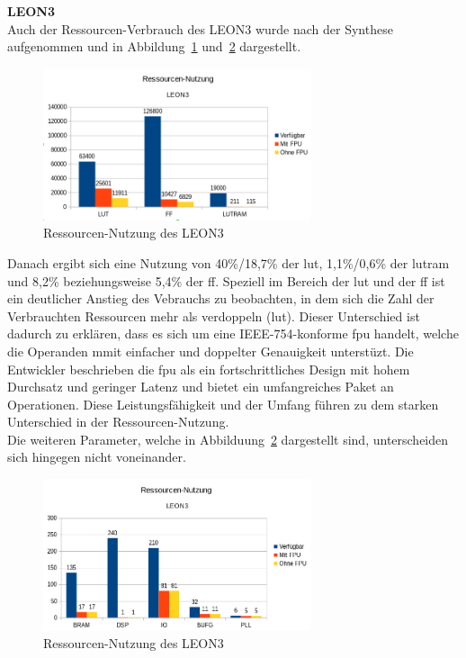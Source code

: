 \textbf{LEON3}\\

Auch der Ressourcen-Verbrauch des LEON3 wurde nach der Synthese aufgenommen und in Abbildung~\ref{fig:ressourcenleon31} und~\ref{fig:ressourcenleon32} dargestellt.\\

\begin{figure}[H]
\centering
\includegraphics[width=0.7\textwidth]{Hauptteil/ressourcennutzungleon31.png}
\caption{Ressourcen-Nutzung des LEON3}
\label{fig:ressourcenleon31}
\end{figure}

Danach ergibt sich eine Nutzung von 40\%/18,7\% der \ac{lut}, 1,1\%/0,6\% der \ac{lutram} und 8,2\% beziehungsweise 5,4\% der \ac{ff}.
Speziell im Bereich der \ac{lut} und der \ac{ff} ist ein deutlicher Anstieg des Vebrauchs zu beobachten, in dem sich die Zahl der Verbrauchten Ressourcen mehr als verdoppeln (\ac{lut}).
Dieser Unterschied ist dadurch zu erklären, dass es sich um eine IEEE-754-konforme \ac{fpu} handelt, welche die Operanden mmit einfacher und doppelter Genauigkeit unterstüzt. Die Entwickler
beschrieben die \ac{fpu} als ein fortschrittliches Design mit hohem Durchsatz und geringer Latenz und bietet ein umfangreiches Paket an Operationen. Diese Leistungsfähigkeit und der Umfang
führen zu dem starken Unterschied in der Ressourcen-Nutzung.\\

Die weiteren Parameter, welche in Abbilduung~\ref{fig:ressourcenleon32} dargestellt sind, unterscheiden sich hingegen nicht voneinander.\\

\begin{figure}[H]
\centering
\includegraphics[width=0.7\textwidth]{Hauptteil/ressourcenleon32.png}
\caption{Ressourcen-Nutzung des LEON3}
\label{fig:ressourcenleon32}
\end{figure}

